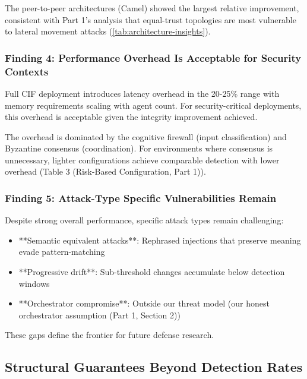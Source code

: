 \documentclass[
]{article}
\begin{document}
The peer-to-peer architectures (Camel) showed the largest relative
improvement, consistent with Part 1's analysis that equal-trust
topologies are most vulnerable to lateral movement attacks
(\cref{tab:architecture-insights}).

\subsubsection{Finding 4: Performance Overhead Is Acceptable for
Security
Contexts}\label{finding-4-performance-overhead-is-acceptable-for-security-contexts}

Full CIF deployment introduces latency overhead in the 20-25\% range
with memory requirements scaling with agent count. For security-critical
deployments, this overhead is acceptable given the integrity improvement
achieved.

The overhead is dominated by the cognitive firewall (input
classification) and Byzantine consensus (coordination). For environments
where consensus is unnecessary, lighter configurations achieve
comparable detection with lower overhead (Table 3 (Risk-Based
Configuration, Part 1)).

\subsubsection{Finding 5: Attack-Type Specific Vulnerabilities
Remain}\label{finding-5-attack-type-specific-vulnerabilities-remain}

Despite strong overall performance, specific attack types remain
challenging:

\begin{itemize}
\item **Semantic equivalent attacks**: Rephrased injections that preserve meaning evade pattern-matching
\item **Progressive drift**: Sub-threshold changes accumulate below detection windows
\item **Orchestrator compromise**: Outside our threat model (our honest orchestrator assumption (Part 1, Section 2))
\end{itemize}

These gaps define the frontier for future defense research.

\subsection{Structural Guarantees Beyond Detection
Rates}\label{structural-guarantees-beyond-detection-rates}
\end{document}
